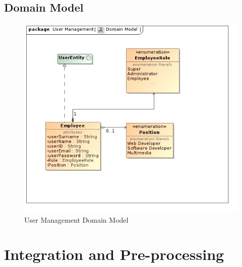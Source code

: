 \documentclass[11pt,a4paper]{article}
\begin{document}
\subsection{Domain Model}
\begin{figure}[H]
	\begin{center}
		\includegraphics[scale=0.6]{../Images/User Domain Model.jpg}
		\caption{User Management Domain Model}
	\end{center}
\end{figure}

\pagebreak

\section{Integration and Pre-processing}
\end{document}
